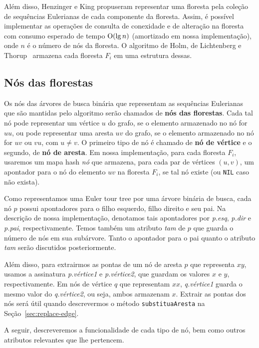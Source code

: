 \raggedbottom

Além disso, Henzinger e King \cite{henzinger_king} propuseram representar uma floresta pela coleção de sequências Eulerianas de cada componente da floresta. Assim, é possível implementar as operações de consulta de conexidade e de alteração na floresta com consumo esperado de tempo $\mathrm{O}(\lg n)$ (amortizado em nossa implementação), onde $n$ é o número de nós da floresta. O algoritmo de Holm, de Lichtenberg e Thorup~\cite{jacob_holm} armazena cada floresta $F_i$ em uma estrutura dessas.

\subsection{Nós das florestas}
\label{sec:graph-nodes}

Os nós das árvores de busca binária que representam as sequências Eulerianas que são mantidas pelo algoritmo serão chamados de \textbf{nós das florestas}. Cada tal nó pode representar um vértice $u$ do grafo, se o elemento armazenado no nó for $uu$, ou pode representar uma aresta $uv$ do grafo, se o elemento armazenado no nó for $uv$ ou $vu$, com $u \neq v$. O primeiro tipo de nó é chamado de \textbf{nó de vértice} e o segundo, de \textbf{nó de aresta}. Em nossa implementação, para cada floresta $F_i$, usaremos um mapa hash \textit{nó} que armazena, para cada par de vértices $(u, v)$, um apontador para o nó do elemento $uv$ na floresta $F_i$, se tal nó existe (ou \texttt{NIL} caso não exista).

Como representamos uma Euler tour tree por uma árvore binária de busca, cada nó $p$ possui apontadores para o filho esquerdo, filho direito e seu pai. Na descrição de nossa implementação, denotamos tais apontadores por \textit{p.esq}, \textit{p.dir} e \textit{p.pai}, respectivamente. Temos também um atributo \textit{tam} de $p$ que guarda o número de nós em sua subárvore. Tanto o apontador para o pai quanto o atributo \textit{tam} serão discutidos posteriormente. 

Além disso, para extrairmos as pontas de um nó de aresta $p$ que representa $xy$, usamos a assinatura \textit{p.vértice1} e \textit{p.vértice2}, que guardam os valores  $x$ e $y$, respectivamente. Em nós de vértice $q$ que representam $xx$, \textit{q.vértice1} guarda o mesmo valor do \textit{q.vértice2}, ou seja, ambos armazenam $x$. Extrair as pontas dos nós será útil quando descrevermos o método \texttt{substituaAresta} na Seção~\ref{sec:replace-edge}. 

A seguir, descreveremos a funcionalidade de cada tipo de nó, bem como outros atributos relevantes que lhe pertencem. 

